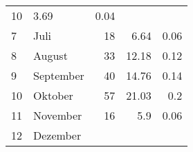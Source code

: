 \begin{longtable}{lXrrr}
       \num{10} &
       \num[round-mode=places,round-precision=2]{3,69} &
         \num[round-mode=places,round-precision=2]{0,04} \\

     7 &
     \multicolumn{1}{X}{ Juli   } &


       \num{18} &
       \num[round-mode=places,round-precision=2]{6,64} &
         \num[round-mode=places,round-precision=2]{0,06} \\

     8 &
     \multicolumn{1}{X}{ August   } &


       \num{33} &
       \num[round-mode=places,round-precision=2]{12,18} &
         \num[round-mode=places,round-precision=2]{0,12} \\

     9 &
     \multicolumn{1}{X}{ September   } &


       \num{40} &
       \num[round-mode=places,round-precision=2]{14,76} &
         \num[round-mode=places,round-precision=2]{0,14} \\

     10 &
     \multicolumn{1}{X}{ Oktober   } &


       \num{57} &
       \num[round-mode=places,round-precision=2]{21,03} &
         \num[round-mode=places,round-precision=2]{0,2} \\

     11 &
     \multicolumn{1}{X}{ November   } &


       \num{16} &
       \num[round-mode=places,round-precision=2]{5,9} &
         \num[round-mode=places,round-precision=2]{0,06} \\

     12 &
     \multicolumn{1}{X}{ Dezember   } &



\end{longtable}
